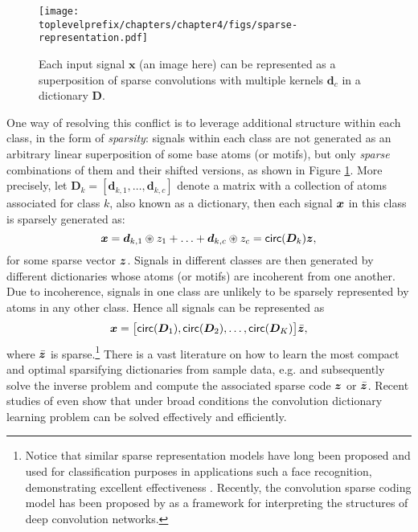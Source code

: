 \documentclass[../../book-main.tex]{subfiles}
\begin{document}
\begin{figure}[t]
	\centerline{
\texttt{[image: \\toplevelprefix/chapters/chapter4/figs/sparse-representation.pdf]}}
	\caption{Each input signal $\bm x$ (an image here) can be represented as a superposition of sparse convolutions with multiple kernels $\bm d_c$ in a dictionary $\bm D$.}
	\label{fig:multi-channel-sparse-representation}
\end{figure}
One way of resolving this conflict is to leverage additional structure within each class, in the form of {\em sparsity}: signals within each class are not generated as an arbitrary linear superposition of some base atoms (or motifs), but only {\em sparse} combinations of them and their shifted versions, as shown in Figure \ref{fig:multi-channel-sparse-representation}. More precisely, let $\bm D_k = [\bm d_{k,1}, \ldots, \bm d_{k,c}]$ denote a matrix with a collection of atoms associated for class $k$, also known as a dictionary, then each signal $\bm{x}$ in this class is sparsely generated as: 
\begin{equation}
    \bm{x} = \bm d_{k,1} \circledast z_1 + \ldots + \bm d_{k,c} \circledast z_c = \mathsf{circ}(\bm{D}_k)\bm{z},
\end{equation}
for some sparse vector $\bm{z}$. Signals in different classes are then generated by different dictionaries whose atoms (or motifs) are incoherent from one another. Due to incoherence, signals in one class are unlikely to be sparsely represented by atoms in any other class. Hence all signals can be represented as
\begin{equation}
\bm{x} = \big[\mathsf{circ}(\bm{D}_1), \mathsf{circ}(\bm{D}_2), \ldots, \mathsf{circ}(\bm{D}_K)\big] \bar {\bm{z}},
\end{equation}
where $\bar {\bm{z}}$ is sparse.\footnote{Notice that similar sparse representation models have long been proposed and used for classification purposes in applications such a face recognition, demonstrating excellent effectiveness  \cite{Wright:2009,wagner2012toward}. Recently, the convolution sparse coding model has been proposed by \cite{papyan2017convolutional} as a framework for interpreting the structures of deep convolution networks.} There is a vast literature on how to learn the most compact and optimal sparsifying dictionaries from sample data, e.g.  \cite{li2019multichannel,qu2019nonconvex} and subsequently solve the inverse problem and compute the associated sparse code $\bm{z}$ or $\bar {\bm{z}}$. Recent studies of \cite{qu2020nonconvex,Qu2020Geometric} even show that under broad conditions the convolution dictionary learning problem can be solved effectively and efficiently. 
\end{document}
